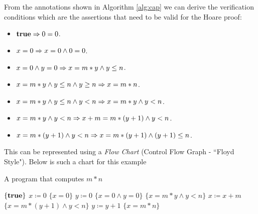 \begin{example}
From the annotations shown in Algorithm \ref{alg:cap} we can derive the verification conditions which are the assertions that need to be valid for the Hoare proof:
\begin{itemize}
    \item $\mathbf{true} \Rightarrow 0 = 0$.
    \item $x=0 \Rightarrow x=0 \land 0=0$.
    \item $x=0 \land y=0 \Rightarrow x=m* y \land y \leq n$.
    \item $x=m* y \land y \leq n \land y \geq n \Rightarrow x=m* n$.
    \item $x=m* y \land y \leq n \land y < n \Rightarrow x=m* y \land y < n$.
    \item $x=m* y \land y < n \Rightarrow x + m=m* (y+1) \land y < n$.
    \item $x= m*(y+1) \land y < n \Rightarrow x = m* (y+1) \land (y+1) \leq n$.
\end{itemize}
 This can be represented using a \emph{Flow Chart} (Control Flow Graph - ``Floyd Style"). Below is such a chart for this example
 \begin{center}
 \end{center}

\end{example}

 \begin{algorithm}[!h]
    \caption{A program that computes $m* n$}\label{alg:cap}
    \begin{algorithmic}
    \State $\{\mathbf{true}\}$
    \State $x \coloneqq 0$
    \State $\{x=0\}$
    \State $y \coloneqq 0$
    \State $\{x=0 \land y=0\}$
     
        \State $\{x = m* y \land y < n\}$
        \State $x \coloneqq x + m$
        \State $\{x = m* (y+1) \land y < n\}$
        \State $y \coloneqq y + 1$
    \EndWhile
    \State $\{x = m* n\}$
    \end{algorithmic}
\end{algorithm}


